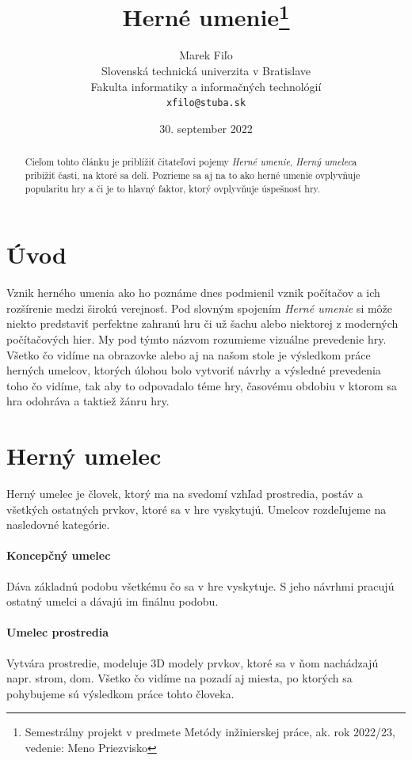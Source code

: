 \documentclass[10pt,twoside,slovak,a4paper]{article}
\title{Herné umenie\thanks{Semestrálny projekt v predmete Metódy inžinierskej práce, ak. rok 2022/23, vedenie: Meno Priezvisko}} %
\author{Marek Fiľo\\[2pt]
	{\small Slovenská technická univerzita v Bratislave}\\
	{\small Fakulta informatiky a informačných technológií}\\
	{\small \texttt{xfilo@stuba.sk}}
	}
\date{\small 30. september 2022} %
\begin{document}
\maketitle

\begin{abstract}


Cieľom tohto článku je priblížiť čitateľovi pojemy \emph{Herné umenie}, \emph{Herný umelec}a pribížiť časti, na ktoré sa delí. Pozrieme sa aj na to ako herné umenie ovplyvňuje popularitu hry a či je to hlavný faktor, ktorý ovplyvňuje úspešnosť hry.
\end{abstract}




\section{Úvod} \label{začiatok}
Vznik herného umenia ako ho poznáme dnes podmienil vznik počítačov a ich rozšírenie medzi širokú verejnosť.
Pod slovným spojením  \emph{Herné umenie} si môže niekto predstaviť perfektne zahranú hru či už šachu alebo niektorej z moderných počítačových hier. My pod týmto názvom rozumieme vizuálne prevedenie hry. Všetko čo vidíme na obrazovke alebo aj na našom stole je výsledkom práce herných umelcov, ktorých úlohou bolo vytvoriť návrhy a výsledné prevedenia toho čo vidíme, tak aby to odpovadalo téme hry, časovému obdobiu v ktorom sa hra odohráva a taktiež žánru hry.














\section{Herný umelec} \label{pokračovanie}
Herný umelec je človek, ktorý ma na svedomí vzhľad prostredia, postáv a všetkých ostatných prvkov, ktoré sa v hre vyskytujú. Umelcov rozdeľujeme na nasledovné kategórie.
\paragraph{Koncepčný umelec} Dáva základnú podobu všetkému čo sa v hre vyskytuje. S jeho návrhmi pracujú ostatný umelci a dávajú im finálnu podobu.
\cite{kon}

\paragraph{Umelec prostredia} Vytvára prostredie, modeluje 3D modely prvkov, ktoré sa v ňom nachádzajú napr. strom, dom. Všetko čo vidíme na pozadí aj miesta, po ktorých sa pohybujeme sú výsledkom práce tohto človeka.
\cite{spectrum}
\end{document}
